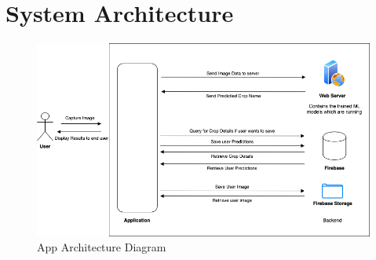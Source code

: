 \documentclass[../Report.tex]{subfiles}
\begin{document}
\section{System Architecture}
\begin{figure}[H]
    \centering
    \includegraphics[width=\linewidth]{images/architecture.png}
    \caption{App Architecture Diagram}
    \label{fig:architecture}
\end{figure}
\end{document}
